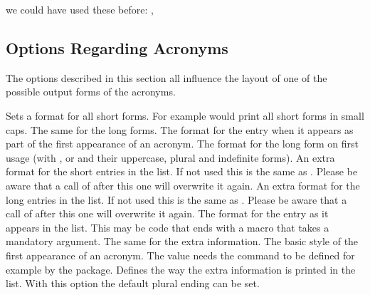 \documentclass[DIV10,toc=index,toc=bib,hyperfootnotes=false]{cnpkgdoc}
\makeatletter
\providecommand*\sinceversion[1]{%
  \@bsphack
  \marginnote{%
    \footnotesize\sffamily\RaggedRight
    \textcolor{black!75}{Introduced in version~#1}}%
  \@esphack}
\providecommand*\changedversion[1]{%
  \@bsphack
  \marginnote{%
    \footnotesize\sffamily\RaggedRight
    \textcolor{black!75}{Changed in version~#1}}%
  \@esphack}
\makeatother
\begin{document}
\begin{beispiel}
 we could have used these before: \nato, \ny
\end{beispiel}

\subsection{Options Regarding Acronyms}
The options described in this section all influence the layout of one of the
possible output forms of the acronyms.
\begin{beschreibung}
 \Default
   Sets a format for all short forms. For example 
   would print all short forms in small caps.
 \Default
   The same for the long forms.
 \Default
   \sinceversion{1.3}%
   The format for the  entry when it appears as part of the first
   appearance of an acronym.
 \Default
   \sinceversion{1.2}%
   The format for the long form on first usage (with ,  or
    and their uppercase, plural and indefinite forms).
 \Default
   \sinceversion{1.1}An extra format for the short entries in the list. If not
   used this is the same as . Please be aware that a call of
    after this one will overwrite it again.
 \Default
   An extra format for the long entries in the list. If not used this is the same
   as . Please be aware that a call of  after
   this one will overwrite it again.
   The format for the  entry as it appears in the list. This may be
   code that ends with a macro that takes a mandatory argument.
 \Default
   The same for the extra information.
   \changedversion{1.1}The basic style of the first appearance of an acronym.
   The value  needs the command  to be defined for
   example by the  package.
   Defines the way the extra information is printed in the list.
   With this option the default plural ending can be set.
\end{beschreibung}
\end{document}
